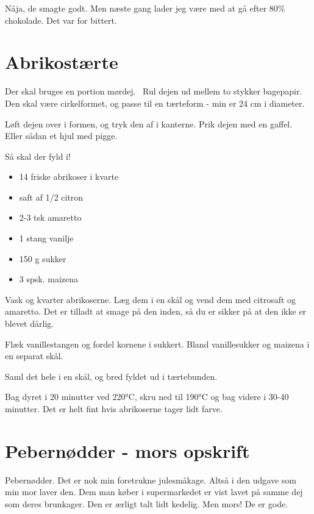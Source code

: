 \documentclass[
  letterpaper,
  DIV=11,
  numbers=noendperiod]{scrreprt}
\providecommand{\tightlist}{%
  \setlength{\itemsep}{0pt}\setlength{\parskip}{0pt}}\usepackage{longtable,booktabs,array}
\begin{document}
Nåja, de smagte godt. Men næste gang lader jeg være med at gå efter 80\%
chokolade. Det var for bittert.

\hypertarget{abrikostuxe6rte}{%
\section{Abrikostærte}\label{abrikostuxe6rte}}

Der skal bruges en portion mørdej.~ Rul dejen ud mellem to stykker
bagepapir. Den skal være cirkelformet, og passe til en tærteform - min
er 24 cm i diameter.

Løft dejen over i formen, og tryk den af i kanterne. Prik dejen med en
gaffel. Eller sådan et hjul med pigge.

Så skal der fyld i!

\begin{itemize}
\tightlist
\item
  14 friske abrikoser i kvarte
\item
  saft af 1/2 citron
\item
  2-3 tsk amaretto
\item
  1 stang vanilje
\item
  150 g sukker
\item
  3 spsk. maizena
\end{itemize}

Vask og kvarter abrikoserne. Læg dem i en skål og vend dem med citrosaft
og amaretto. Det er tilladt at smage på den inden, så du er sikker på at
den ikke er blevet dårlig.

Flæk vanillestangen og fordel kornene i sukkert. Bland vanillesukker og
maizena i en separat skål.

Saml det hele i en skål, og bred fyldet ud i tærtebunden.

Bag dyret i 20 minutter ved 220°C, skru ned til 190°C og bag videre i
30-40 minutter. Det er helt fint hvis abrikoserne tager lidt farve.

\hypertarget{pebernuxf8dder---mors-opskrift}{%
\section{Pebernødder - mors
opskrift}\label{pebernuxf8dder---mors-opskrift}}

Pebernødder. Det er nok min foretrukne julesmåkage. Altså i den udgave
som min mor laver den. Dem man køber i supermarkedet er vist lavet på
samme dej som deres brunkager. Den er ærligt talt lidt kedelig. Men
mors! De er gode.
\end{document}
